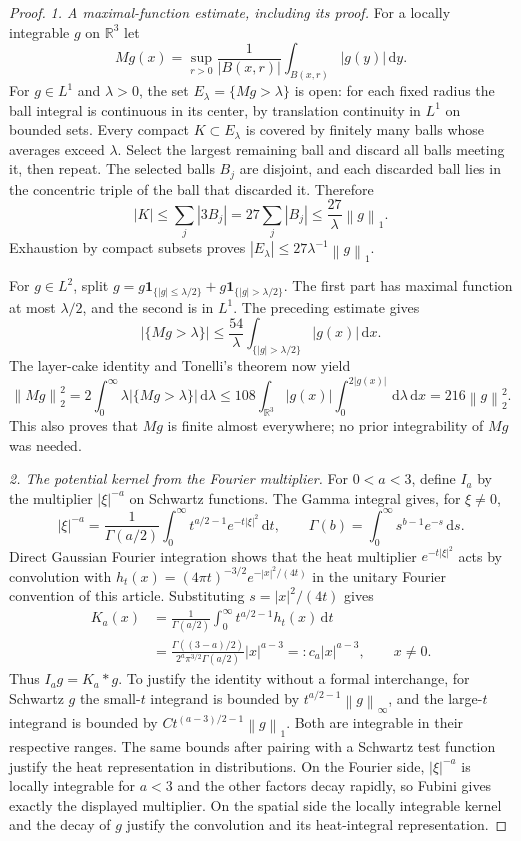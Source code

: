 \documentclass[11pt,a4paper]{article}
\theoremstyle{definition}\newtheorem{definition}[theorem]{Definition}
\theoremstyle{remark}\newtheorem{remark}[theorem]{Remark}
\newcommand{\R}{\mathbb R}\newcommand{\TT}{\mathbb T^3}
\newcommand{\dd}{\,\mathrm d}\newcommand{\eps}{\varepsilon}
\newcommand{\norm}[1]{\left\lVert#1\right\rVert}
\begin{document}
\begin{proof}
\emph{1. A maximal-function estimate, including its proof.}
For a locally integrable $g$ on $\R^3$ let
\[
 Mg(x)=\sup_{r>0}\frac{1}{|B(x,r)|}
                    \int_{B(x,r)}|g(y)|\dd y.
\]
For $g\in L^1$ and $\lambda>0$, the set $E_\lambda=\{Mg>\lambda\}$
is open: for each fixed radius the ball integral is continuous in its
center, by translation continuity in $L^1$ on bounded sets.  Every compact
$K\subset E_\lambda$ is covered by finitely many balls whose averages
exceed $\lambda$.  Select the largest remaining ball and discard all balls
meeting it, then repeat.  The selected balls $B_j$ are disjoint, and each
discarded ball lies in the concentric triple of the ball that discarded it.
Therefore
\[
 |K|\le\sum_j|3B_j|=27\sum_j|B_j|
       \le\frac{27}{\lambda}\norm{g}_1.
\]
Exhaustion by compact subsets proves
$|E_\lambda|\le27\lambda^{-1}\norm{g}_1$.

For $g\in L^2$, split $g=g\mathbf1_{\{|g|\le\lambda/2\}}
+g\mathbf1_{\{|g|>\lambda/2\}}$.  The first part has maximal function at
most $\lambda/2$, and the second is in $L^1$.  The preceding estimate gives
\[
 |\{Mg>\lambda\}|\le\frac{54}{\lambda}
             \int_{\{|g|>\lambda/2\}}|g(x)|\dd x.
\]
The layer-cake identity and Tonelli's theorem now yield
\begin{equation}\label{eq:critical-maximal-ltwo}
 \norm{Mg}_2^2
 =2\int_0^\infty\lambda|\{Mg>\lambda\}|\dd\lambda
 \le108\int_{\R^3}|g(x)|
             \int_0^{2|g(x)|}\dd\lambda\dd x
 =216\norm{g}_2^2.
\end{equation}
This also proves that $Mg$ is finite almost everywhere; no prior
integrability of $Mg$ was needed.

\emph{2. The potential kernel from the Fourier multiplier.}
For $0<a<3$, define $I_a$ by the multiplier $|\xi|^{-a}$ on Schwartz
functions.  The Gamma integral gives, for $\xi\ne0$,
\[
 |\xi|^{-a}=\frac{1}{\Gamma(a/2)}
       \int_0^\infty t^{a/2-1}e^{-t|\xi|^2}\dd t,
 \qquad
 \Gamma(b)=\int_0^\infty s^{b-1}e^{-s}\dd s.
\]
Direct Gaussian Fourier integration shows that the heat multiplier
$e^{-t|\xi|^2}$ acts by convolution with
$h_t(x)=(4\pi t)^{-3/2}e^{-|x|^2/(4t)}$ in the unitary Fourier convention
of this article.  Substituting $s=|x|^2/(4t)$ gives
\begin{align*}
 K_a(x)&=\frac{1}{\Gamma(a/2)}
           \int_0^\infty t^{a/2-1}h_t(x)\dd t\\
 &=\frac{\Gamma((3-a)/2)}{2^a\pi^{3/2}\Gamma(a/2)}|x|^{a-3}
   =:c_a|x|^{a-3},\qquad x\ne0.
\end{align*}
Thus $I_ag=K_a*g$.  To justify the identity without a formal interchange,
for Schwartz $g$ the small-$t$ integrand is bounded by
$t^{a/2-1}\norm{g}_\infty$, and the large-$t$ integrand is bounded by
$C t^{(a-3)/2-1}\norm{g}_1$.  Both are integrable in their respective
ranges.  The same bounds after pairing with a Schwartz test function
justify the heat representation in distributions.  On the Fourier side,
$|\xi|^{-a}$ is locally integrable for $a<3$ and the other factors decay
rapidly, so Fubini gives exactly the displayed multiplier.  On the spatial
side the locally integrable kernel and the decay of $g$ justify the
convolution and its heat-integral representation.


\end{proof}
\end{document}
